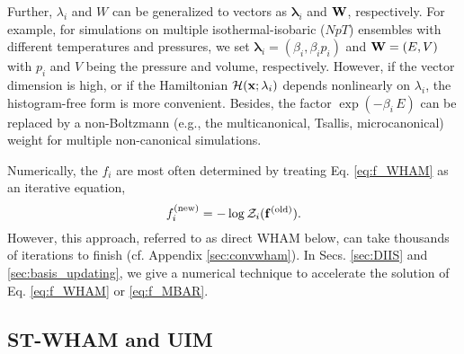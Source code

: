 \documentclass[reprint,aip,jcp,superscriptaddress]{revtex4-1}
\begin{document}
Further,
$\lambda_i$ and $W$
can be generalized
to vectors as
$\bm{\lambda}_i$
and
$\mathbf{W}$, respectively.
%
For example,
for simulations
on multiple isothermal-isobaric ($NpT$) ensembles
with different temperatures and pressures,
%
we set
$\bm{\lambda}_i = (\beta_i, \beta_i p_i)$
and
$\mathbf{W} = (E, V)$
with
$p_i$ and $V$
being the pressure and volume,
respectively.
%
However, if the vector dimension is high,
or if the Hamiltonian $\mathcal{H}(\mathbf{x}; \lambda_i)$
depends nonlinearly on $\lambda_i$,
the histogram-free form is more convenient\cite{
shirts2008}.
%
Besides,
the factor $\exp(-\beta_i \, E)$
can be replaced by
a non-Boltzmann
(e.g., the multicanonical\cite{
mezei1987, *berg1992, *lee1993},
Tsallis\cite{tsallis1988},
microcanonical\cite{
yan2003, *martin-mayor2007, *zhang2013})
weight
for multiple non-canonical simulations\cite{
kim2011}.
%



Numerically, the
$f_i$ are most often determined by treating Eq. \eqref{eq:f_WHAM}
as an iterative equation,
%
\begin{equation*}
f_i^\mathrm{(new)}
=
-\log \mathcal{Z}_i( \mathbf{f}^\mathrm{(old)} ).
\end{equation*}
%
However, this approach, referred to as direct WHAM below,
can take thousands of iterations to finish\cite{
bereau2009, kim2011, zhu2012}
(cf. Appendix \ref{sec:convwham}).
%
In Secs. \ref{sec:DIIS} and \ref{sec:basis_updating},
we give a numerical technique to
accelerate the solution
of Eq. \eqref{eq:f_WHAM} or \eqref{eq:f_MBAR}.





\subsection{ST-WHAM and UIM}
\end{document}
